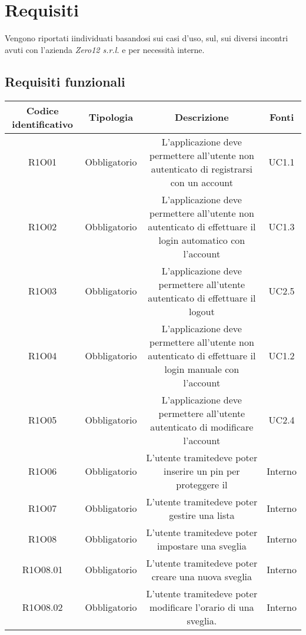 \chapter{Requisiti}
Vengono riportati iindividuati basandosi sui casi d'uso, sul, sui diversi incontri avuti con l'azienda \textit{Zero12 s.r.l.} e per necessità interne. \\


\newpage
\section{Requisiti funzionali}
\begin{tabularx}{\textwidth}{|C|C|C|C|}
	\hline
     \textbf{Codice identificativo} & \textbf{Tipologia} & \textbf{Descrizione} & \textbf{Fonti} \\
    \hline
	\endhead
	R1O01& Obbligatorio &L'applicazione deve permettere all'utente non autenticato di registrarsi con un account& UC1.1	\\
	\hline
	R1O02& Obbligatorio &L'applicazione deve permettere all'utente non autenticato di effettuare il login automatico con l'account & UC1.3\\
	\hline
	R1O03& Obbligatorio &L'applicazione deve permettere all'utente autenticato di  effettuare il logout & UC2.5\\
	\hline
	R1O04& Obbligatorio &L'applicazione deve permettere all'utente non autenticato di effettuare il login manuale con l'account& UC1.2\\
	\hline
	R1O05& Obbligatorio&L'applicazione deve permettere all'utente autenticato di modificare l'account& UC2.4\\
	\hline
	R1O06& Obbligatorio&L'utente tramitedeve poter inserire un pin per proteggere il & Interno \\
	\hline
	R1O07& Obbligatorio & L'utente tramitedeve poter gestire una lista& Interno\\
	\hline
	R1O08& Obbligatorio &L'utente tramitedeve poter impostare una sveglia &Interno\\
	\hline
	R1O08.01 & Obbligatorio & L'utente tramitedeve poter creare una nuova sveglia &Interno\\
	\hline
	R1O08.02 & Obbligatorio & L'utente tramitedeve poter modificare l'orario di una sveglia. &Interno\\

\end{tabularx}
